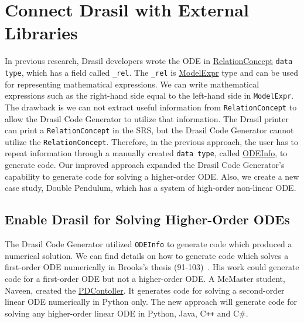 \section{Connect Drasil with External Libraries}
\label{se_connecteetolib}

In previous research, Drasil developers wrote the ODE in \href{https://jacquescarette.github.io/Drasil/docs/full/drasil-lang-0.1.60.0/Language-Drasil-Chunk-Relation.html#t:RelationConcept}{RelationConcept} \verb|data type|, which has a field called \verb|_rel|. The \verb|_rel| is \href{https://jacquescarette.github.io/Drasil/docs/full/drasil-lang-0.1.60.0/Language-Drasil-ModelExpr-Lang.html#t:ModelExpr}{ModelExpr} type and can be used for representing mathematical expressions. We can write mathematical expressions such as the right-hand side equal to the left-hand side in \verb|ModelExpr|. The drawback is we can not extract useful information from \verb|RelationConcept| to allow the Drasil Code Generator to utilize that information. The Drasil printer can print a \verb|RelationConcept| in the SRS, but the Drasil Code Generator cannot utilize the \verb|RelationConcept|. Therefore, in the previous approach, the user has to repeat information through a manually created \verb|data type|, called \href{https://jacquescarette.github.io/Drasil/docs/drasil-code-0.1.9.0/Language-Drasil-Code.html#t:ODEInfo}{ODEInfo}, to generate code. Our improved approach expanded the Drasil Code Generator's capability to generate code for solving a higher-order ODE. Also, we create a new case study, Double Pendulum, which has a system of high-order non-linear ODE.

\subsection{Enable Drasil for Solving Higher-Order ODEs}
The Drasil Code Generator utilized \verb|ODEInfo| to generate code which produced a numerical solution. We can find details on how to generate code which solves a first-order ODE numerically in Brooks's thesis (91-103)~\citep{brooks}. His work could generate code for a first-order ODE but not a higher-order ODE. A McMaster student, Naveen, created the \href{https://jacquescarette.github.io/Drasil/examples/pdcontroller/SRS/srs/PDController_SRS.html}{PDContoller}. It generates code for solving a second-order linear ODE numerically in Python only. The new approach will generate code for solving any higher-order linear ODE in Python, Java, C\texttt{++} and C\#.

